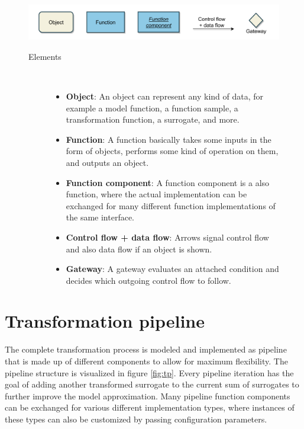 \documentclass[
  a4paper,  %
  twoside,  %
  bibliography=totoc,
  headsepline,
  cleardoublepage=empty,
  parskip=half,
  draft=false
]{scrbook}
\begin{document}
\begin{mdframed}[style=style,frametitle={Notation}]
\begin{figure}[H]

\includegraphics[width=\textwidth]{graphics/definitions.pdf}
\vspace{-7.5mm}

\delimit

\vspace{3.5mm}

\begin{description}
\item[Elements] {~ \begin{itemize}[\null]
\item \textbf{Object}: An object can represent any kind of data, for example a model function, a function sample, a transformation function, a surrogate, and more.
\item \textbf{Function}: A function basically takes some inputs in the form of objects, performs some kind of operation on them, and outputs an object.
\item \textbf{Function component}: A function component is a also function, where the actual implementation can be exchanged for many different function implementations of the same interface.
\item \textbf{Control flow + data flow}: Arrows signal control flow and also data flow if an object is shown.
\item \textbf{Gateway}: A gateway evaluates an attached condition and decides which outgoing control flow to follow.
\end{itemize}}
\end{description}

\delimit

\label{fig:defs}
\end{figure}
\end{mdframed}


\newpage
\section{Transformation pipeline}
\label{sec:tp}

The complete transformation process is modeled and implemented as pipeline that is made up of different components to allow for maximum flexibility.
The pipeline structure is visualized in figure \cref{fig:tp}.
Every pipeline iteration has the goal of adding another transformed surrogate to the current sum of surrogates to further improve the model approximation.
Many pipeline function components can be exchanged for various different implementation types, where instances of these types can also be customized by passing configuration parameters.
\end{document}
